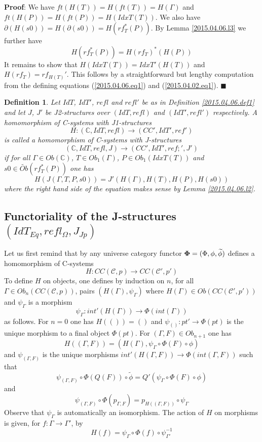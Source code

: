 \documentclass[12pt]{article}
\numberwithin{equation}{section}
\newenvironment{myproof}{{\bf Proof}:}{$\blacksquare$ \vskip 5mm }
\newtheorem{definition}[proposition]{Definition}
\newcommand{\llabel}[1]{\label{#1}}
\newcommand{\sr}{\rightarrow}
\newcommand{\wt}{\widetilde}
\newcommand{\toCC}{CC} %
\newcommand{\aCC}{{\mathbb C}}  %
\begin{document}
%
\begin{myproof}
We have $ft(H(T))=H(ft(T))=H(\Gamma)$ and $ft(H(P))=H(ft(P))=H(IdxT(T))$. We
also have $\partial(H(s0))=H(\partial(s0))=H(rf_T^*(P))$. By Lemma
\ref{2015.04.06.l3} we further have
%
$$H(rf_T^*(P))=H(rf_T)^*(H(P))$$
%
It remains to show that $H(IdxT(T))=IdxT'(H(T))$ and $H(rf_T)=rf_{H(T)}'$. This
follows by a straightforward but lengthy computation from the defining
equations (\ref{2015.04.06.eq1}) and (\ref{2015.04.02.eq1}).
\end{myproof}
%
\begin{definition}
\llabel{2015.04.06.def2} Let $IdT$, $IdT'$, $refl$ and $refl'$ be as in
Definition \ref{2015.04.06.def1} and let $J$, $J'$ be J2-structures over
$(IdT,refl)$ and $(IdT',refl')$ respectively. A homomorphism of C-systems with
J1-structures
%
$$H:(\aCC,IdT,refl)\sr (CC',IdT',ref')$$
%
is called a homomorphism of C-systems with J-structures
%
$$(\aCC,IdT,refl,J)\sr (CC',IdT',ref;',J')$$
%
if for all $\Gamma\in Ob(\aCC)$, $T\in Ob_1(\Gamma)$, $P\in Ob_1(IdxT(T))$ and
$s0\in \wt{Ob}(rf_T^*(P))$ one has
%
$$H(J(\Gamma,T,P,s0))=J'(H(\Gamma),H(T),H(P),H(s0))$$
%
where the right hand side of the equation makes sense by Lemma
\ref{2015.04.06.l2}.
\end{definition}
%











\subsection{Functoriality of the J-structures $(IdT_{Eq},refl_{\Omega},J_{Jp})$}
%
\label{2015.04.12.sec1}
%
Let us first remind that by \cite[Construction 3.3]{Cfromauniverse} any
universe category functor ${\bf \Phi}=(\Phi,\phi,\wt{\phi})$ defines a
homomorphism of C-systems
%
$$H:\toCC({\mathcal C},p)\sr \toCC({\mathcal C}',p')$$
%
To define $H$ on objects, one defines by induction on $n$, for all $\Gamma\in
Ob_n(\toCC({\mathcal C},p))$, pairs $(H(\Gamma),\psi_{\Gamma})$ where
$H(\Gamma)\in Ob(\toCC({\mathcal C}',p'))$ and $\psi_{\Gamma}$ is a morphism
%
$$\psi_{\Gamma}:int'(H(\Gamma))\sr \Phi(int(\Gamma))$$
%
as follows. For $n=0$ one has $H(())=()$ and $\psi_{()}:pt'\sr \Phi(pt)$ is the
unique morphism to a final object $\Phi(pt)$. For $(\Gamma,F)\in Ob_{n+1}$ one
has
%
$$H((\Gamma,F))=(H(\Gamma),\psi_{\Gamma}\circ\Phi(F)\circ \phi)$$
%
and $\psi_{(\Gamma,F)}$ is the unique morphisms $int'(H(\Gamma,F))\sr
\Phi(int(\Gamma,F))$ such that
%
$$\psi_{(\Gamma,F)}\circ
\Phi(Q(F))\circ\wt{\phi}=Q'(\psi_{\Gamma}\circ\Phi(F)\circ\phi)$$
%
and
%
$$\psi_{(\Gamma,F)}\circ \Phi(p_{\Gamma,F})=p_{H((\Gamma,F))}\circ
\psi_{\Gamma}$$
%
Observe that $\psi_{\Gamma}$ is automatically an isomorphism. The action of $H$
on morphisms is given, for $f:\Gamma\sr\Gamma'$, by
%
$$H(f)=\psi_{\Gamma}\circ\Phi(f)\circ\psi_{\Gamma'}^{-1}$$
%
\end{document}
